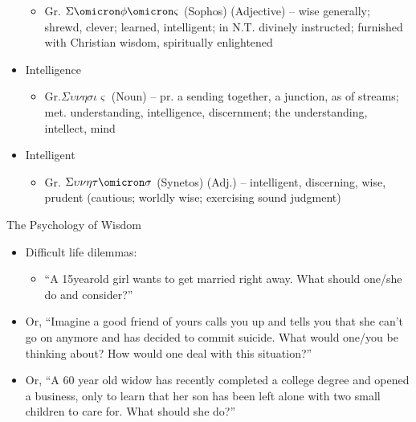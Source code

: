 \documentclass[
]{book}
\providecommand{\tightlist}{%
  \setlength{\itemsep}{0pt}\setlength{\parskip}{0pt}}
\begin{document}
\begin{reflect}
\begin{itemize}
  \begin{itemize}
  \tightlist
  \item
    Gr. \(\Sigma\omicron\phi\omicron\varsigma\) (Sophos) (Adjective) -- wise generally; shrewd, clever; learned, intelligent; in N.T. divinely instructed; furnished with Christian wisdom, spiritually enlightened
  \end{itemize}
\item
  Intelligence

  \begin{itemize}
  \tightlist
  \item
    Gr.\(\Sigma\upsilon\nu\eta\sigma\iota\varsigma\) (Noun) -- pr. a sending together, a junction, as of streams; met. understanding, intelligence, discernment; the understanding, intellect, mind\\
  \end{itemize}
\item
  Intelligent

  \begin{itemize}
  \tightlist
  \item
    Gr. \(\Sigma\upsilon\nu\eta\tau\omicron\sigma\) (Synetos) (Adj.) -- intelligent, discerning, wise, prudent (cautious; worldly wise; exercising sound judgment)
  \end{itemize}
\end{itemize}

The Psychology of Wisdom

\begin{itemize}
\tightlist
\item
  Difficult life dilemmas:

  \begin{itemize}
  \tightlist
  \item
    ``A 15yearold girl wants to get married right away. What should one/she do and consider?''
  \end{itemize}
\item
  Or, ``Imagine a good friend of yours calls you up and tells you that she can't go on anymore and has decided to commit suicide. What would one/you be thinking about? How would one deal with this situation?''\\
\item
  Or, ``A 60 year old widow has recently completed a college degree and opened a business, only to learn that her son has been left alone with two small children to care for. What should she do?''
\end{itemize}


\end{reflect}
\end{document}
